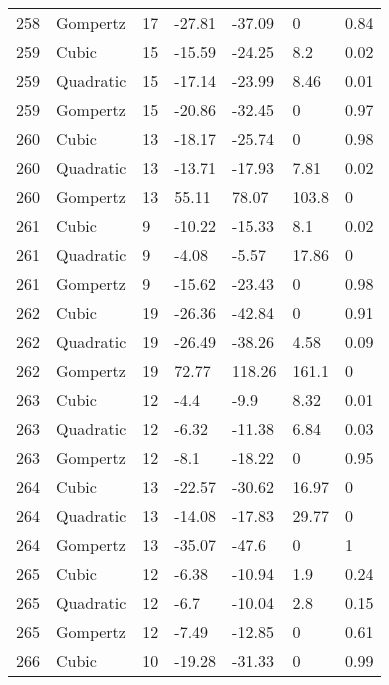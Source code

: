 \documentclass[11pt]{article}
\begin{document}
\begin{center}
\begin{longtable}{lllllll}
    258 & Gompertz  & 17              & -27.81  & -37.09  & 0       & 0.84 \\
    259 & Cubic     & 15              & -15.59  & -24.25  & 8.2     & 0.02 \\
    259 & Quadratic & 15              & -17.14  & -23.99  & 8.46    & 0.01 \\
    259 & Gompertz  & 15              & -20.86  & -32.45  & 0       & 0.97 \\
    260 & Cubic     & 13              & -18.17  & -25.74  & 0       & 0.98 \\
    260 & Quadratic & 13              & -13.71  & -17.93  & 7.81    & 0.02 \\
    260 & Gompertz  & 13              & 55.11   & 78.07   & 103.8   & 0    \\
    261 & Cubic     & 9               & -10.22  & -15.33  & 8.1     & 0.02 \\
    261 & Quadratic & 9               & -4.08   & -5.57   & 17.86   & 0    \\
    261 & Gompertz  & 9               & -15.62  & -23.43  & 0       & 0.98 \\
    262 & Cubic     & 19              & -26.36  & -42.84  & 0       & 0.91 \\
    262 & Quadratic & 19              & -26.49  & -38.26  & 4.58    & 0.09 \\
    262 & Gompertz  & 19              & 72.77   & 118.26  & 161.1   & 0    \\
    263 & Cubic     & 12              & -4.4    & -9.9    & 8.32    & 0.01 \\
    263 & Quadratic & 12              & -6.32   & -11.38  & 6.84    & 0.03 \\
    263 & Gompertz  & 12              & -8.1    & -18.22  & 0       & 0.95 \\
    264 & Cubic     & 13              & -22.57  & -30.62  & 16.97   & 0    \\
    264 & Quadratic & 13              & -14.08  & -17.83  & 29.77   & 0    \\
    264 & Gompertz  & 13              & -35.07  & -47.6   & 0       & 1    \\
    265 & Cubic     & 12              & -6.38   & -10.94  & 1.9     & 0.24 \\
    265 & Quadratic & 12              & -6.7    & -10.04  & 2.8     & 0.15 \\
    265 & Gompertz  & 12              & -7.49   & -12.85  & 0       & 0.61 \\
    266 & Cubic     & 10              & -19.28  & -31.33  & 0       & 0.99 \\

\end{longtable}
\end{center}
\end{document}
